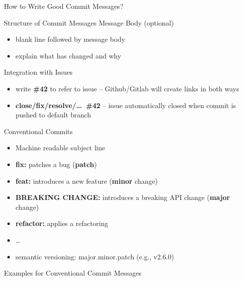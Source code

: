 \begin{frame}{How to Write Good Commit Messages?}
\begin{fancycolumns}
\begin{definition}{Structure of Commit Messages }
			Message Body (optional)
			\vspace{-1mm}
			\begin{itemize}
				\item blank line followed by message body
				\item explain what has changed and why
			\end{itemize}
		\end{definition}
		\vspace{-1mm}
		\begin{note}{Integration with Issues }
			\begin{itemize}
				\item write \textbf{\#42} to refer to issue -- Github/Gitlab will create links in both ways
				\item \textbf{close/fix/resolve/\ldots\ \#42} -- issue automatically closed when commit is pushed to default branch
			\end{itemize}
		\end{note}
		\nextcolumn
		\begin{definition}{Conventional Commits }
			\begin{itemize}
				\item Machine readable subject line
				\item \textbf{fix:} patches a bug (\textbf{patch})
				\item \textbf{feat:} introduces a new feature (\textbf{minor} change)
				\item \textbf{BREAKING CHANGE:} introduces a breaking API change (\textbf{major} change)
				\item \textbf{refactor:} applies a refactoring
				\item \ldots
				\item semantic versioning: major.minor.patch (e.g., v2.6.0)
			\end{itemize}
		\end{definition}
	\end{fancycolumns}
\end{frame}

\begin{frame}{Examples for Conventional Commit Messages}
	\centering{}
\end{frame}

